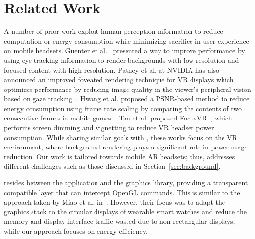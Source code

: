 \section{Related Work}
\label{sec:related}




A number of prior work %
exploit human perception information to reduce computation or 
energy consumption while minimizing sacrifice in user experience on mobile headsets.
%
Guenter et al.~\cite{Guenter:2012:FG} presented a way to 
improve performance by using eye tracking information to render backgrounds 
with low resolution and focused-content with high resolution.
%
Patney et al. at NVIDIA has also announced an improved foveated rendering 
technique for VR displays which optimizes performance by reducing image 
quality in the viewer's peripheral vision based on gaze tracking~\cite{foveated_rendering}.
%
Hwang et al. proposed a PSNR-based method to reduce energy consumption using
frame rate scaling by comparing the contents of two consecutive frames in
mobile games~\cite{Hwang:2017:RPO}.
%
Tan et al. proposed FocusVR~\cite{focusVR}, which performs screen dimming and vignetting to reduce VR headset power consumption.
%
While sharing similar goals with {\myit}, these works focus on the VR environment, where background rendering plays a significant role in power usage reduction. Our work is tailored towards mobile AR headsets; thus, addresses different challenges such as those discussed in Section~\ref{sec:background}.



{\myit} resides between the application and the graphics library, providing a
transparent compatible layer that can intercept OpenGL commands.
This is similar to the approach taken by Miao et al. 
in~\cite{Miao:2016:TYG:2873587.2873603}.
However, their focus was to adapt the graphics stack to the circular 
displays of wearable smart watches and reduce the memory and display interface
traffic wasted due to non-rectangular displays, while our approach focuses on
energy efficiency.

